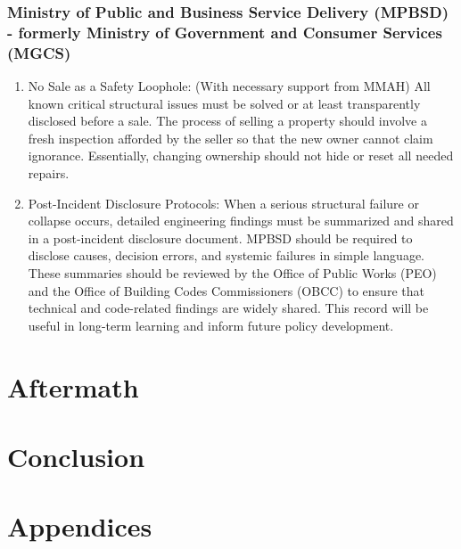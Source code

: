 \documentclass[12pt]{article}
\begin{document}
\subsubsection{Ministry of Public and Business Service Delivery (MPBSD) - formerly Ministry of Government and Consumer Services (MGCS)}
\begin{enumerate}
    \item No Sale as a Safety Loophole: (With necessary support from MMAH) All known critical structural issues must be solved or at least transparently disclosed before a sale. The process of selling a property should involve a fresh inspection afforded by the seller so that the new owner cannot claim ignorance. Essentially, changing ownership should not hide or reset all needed repairs.

    \item Post-Incident Disclosure Protocols: When a serious structural failure or collapse occurs, detailed engineering findings must be summarized and shared in a post-incident disclosure document. MPBSD should be required to disclose causes, decision errors, and systemic failures in simple language. These summaries should be reviewed by the Office of Public Works (PEO) and the Office of Building Codes Commissioners (OBCC) to ensure that technical and code-related findings are widely shared. This record will be useful in long-term learning and inform future policy development.
\end{enumerate}




\section{Aftermath}

\section{Conclusion}


\section*{Appendices}

\newpage
\printbibliography
\end{document}
